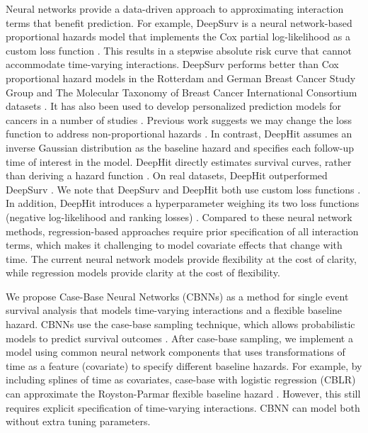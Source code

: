 \documentclass[preprint,12pt]{elsarticle}
\begin{document}
Neural networks provide a data-driven approach to approximating interaction terms that benefit prediction. For example,
DeepSurv is a neural network-based proportional hazards model that implements the Cox partial log-likelihood
as a custom loss function \citep{katzman2018DeepSurv}. This results in a stepwise absolute risk curve that cannot
accommodate time-varying interactions. DeepSurv performs better than Cox proportional hazard models in the Rotterdam and German Breast Cancer Study Group and The Molecular Taxonomy of Breast Cancer International Consortium datasets \citep{katzman2018DeepSurv}. It has also been used to develop personalized prediction models for cancers in a number of studies \citep{ds1} \citep{ds2} \citep{ds3}. Previous work suggests we may change the loss function to address
non-proportional hazards \citep{faraggi1995neural}. In contrast, DeepHit assumes an inverse Gaussian distribution
as the baseline hazard \citep{lee2018DeepHit} and specifies each follow-up time of interest in the model. DeepHit
directly estimates survival curves, rather than deriving a hazard function \citep{lee2018DeepHit}. On real datasets,
DeepHit outperformed DeepSurv \citep{lee2018DeepHit}. We note that DeepSurv and DeepHit both use custom loss
functions \citep{katzman2018DeepSurv} \citep{lee2018DeepHit}. In addition, DeepHit introduces a hyperparameter
weighing its two loss functions (negative log-likelihood and ranking losses) \citep{lee2018DeepHit}. Compared
to these neural network methods, regression-based approaches require prior specification of all interaction terms,
which makes it challenging to model covariate effects that change with time. The current neural network models
provide flexibility at the cost of clarity, while regression models provide clarity at the cost of flexibility.

We propose Case-Base Neural Networks (CBNNs) as a method for single event survival analysis that models
time-varying interactions and a flexible baseline hazard. CBNNs use the case-base sampling technique, which
allows probabilistic models to predict survival outcomes \citep{hanley2009}. After case-base sampling, we
implement a model using common neural network components that uses transformations of time as a feature
(covariate) to specify different baseline hazards. For example, by including splines of time as covariates,
case-base with logistic regression (CBLR) can approximate the Royston-Parmar flexible baseline hazard
\citep{royston2002flexible} \citep{hanley2009}. However, this still requires explicit specification of
time-varying interactions. CBNN can model both without extra tuning parameters.
\end{document}

